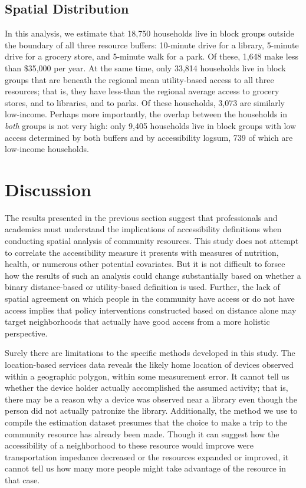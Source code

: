 \documentclass[review, 3p]{elsarticle} %
\begin{document}
\hypertarget{spatial-distribution}{%
\subsection{Spatial Distribution}\label{spatial-distribution}}

In this analysis,
we estimate that 18,750 households live in block groups outside the
boundary of all three resource buffers: 10-minute drive for a library, 5-minute drive for
a grocery store, and 5-minute walk for a park. Of these, 1,648 make less
than \$35,000 per year.
At the same time, only 33,814 households
live in block groups that are beneath the regional mean utility-based access to
all three resources; that is, they have less-than the regional average access to
grocery stores, and to libraries, and to parks. Of these households, 3,073
are similarly low-income. Perhaps more importantly, the overlap between the households
in \emph{both} groups is not very high: only 9,405 households live
in block groups with low access determined by both buffers and by accessibility
logsum, 739 of which are low-income households.

\hypertarget{discussion}{%
\section{Discussion}\label{discussion}}

The results presented in the previous section suggest that professionals and
academics must understand the implications of accessibility definitions when
conducting spatial analysis of community resources. This study does not attempt
to correlate the accessibility measure it presents with measures of nutrition,
health, or numerous other potential covariates. But it is not difficult to forsee
how the results of such an analysis could change substantially based on whether a
binary distance-based or utility-based definition is used. Further, the lack of
spatial agreement on which people in the community have access or do not have access
implies that policy interventions constructed based on distance alone may target
neighborhoods that actually have good access from a more holistic perspective.

Surely there are limitations to the specific methods developed in this study.
The location-based services data
reveals the likely home location of devices observed within a geographic
polygon, within some measurement error. It cannot tell us whether the device
holder actually accomplished the assumed activity; that is, there may be a
reason why a device was observed near a library even though the person did not
actually patronize the library. Additionally, the method we use to compile the
estimation dataset presumes that the choice to make a trip to the community
resource has already been made. Though it can suggest how the accessibility of a
neighborhood to these resource would improve were transportation impedance
decreased or the resources expanded or improved, it cannot tell us how many more
people might take advantage of the resource in that case.
\end{document}
